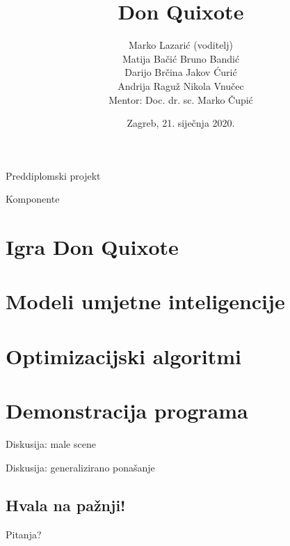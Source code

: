 \documentclass{beamer}
\title{Don Quixote}
\date{\vspace{1em}Zagreb, 21. siječnja 2020.}
\institute{Fakultet elektrotehnike i računarstva}
\author{Marko Lazarić (voditelj)  \\ Matija Bačić \hspace*{10em} Bruno Bandić \\ Darijo Brčina \hspace*{9.75em} Jakov Ćurić \\ Andrija Raguž \hspace*{9.3em} Nikola Vnučec \\[1em] Mentor: Doc. dr. sc. Marko Čupić}
\begin{document}
  \begin{frame}
  	\centering
  	\vspace{2em}
  	Preddiplomski projekt
  	\vspace{-4em}
  	
  	\titlepage
  \end{frame}

  \begin{frame}{Komponente}
	\tableofcontents
  \end{frame}

  \section{Igra Don Quixote}
  

  \section{Modeli umjetne inteligencije}
  

  \section{Optimizacijski algoritmi}
  

  \section*{Demonstracija programa}

  \begin{frame}{Diskusija: male scene}
  \end{frame}

  \begin{frame}{Diskusija: generalizirano ponašanje}
  \end{frame}
  
  \begin{frame}[plain]
  	\section*{Hvala na pažnji!}
  	\hspace{15em}Pitanja?
  \end{frame}
  
\end{document}
